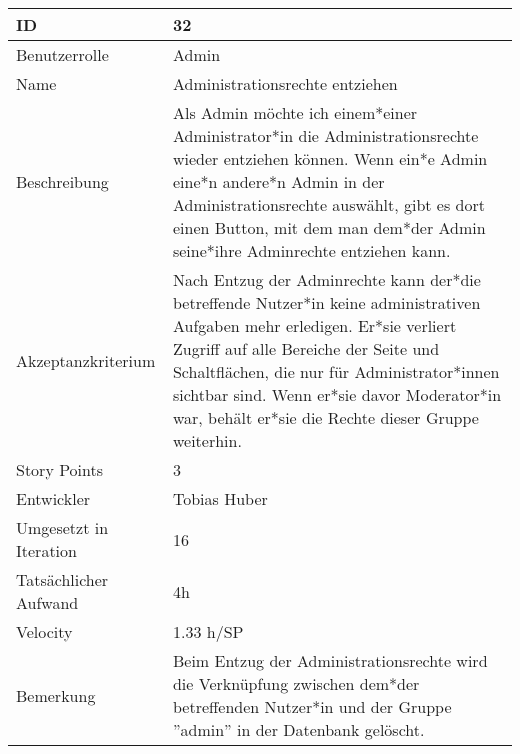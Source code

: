 \begin{tabularx}{\textwidth}{|p{}|X|}
	\hline
	ID & 32 \\
	\hline
	Benutzerrolle & Admin \\
	\hline
	Name & Administrationsrechte entziehen\\
	\hline
	Beschreibung & Als Admin möchte ich einem*einer Administrator*in die Administrationsrechte wieder entziehen können. Wenn ein*e Admin eine*n andere*n Admin in der Administrationsrechte auswählt, gibt es dort einen Button, mit dem man dem*der Admin seine*ihre Adminrechte entziehen kann.  \\
	\hline
	Akzeptanzkriterium & Nach Entzug der Adminrechte kann der*die betreffende Nutzer*in keine administrativen Aufgaben mehr erledigen. Er*sie verliert Zugriff auf alle Bereiche der Seite und Schaltflächen, die nur für Administrator*innen sichtbar sind. Wenn er*sie davor Moderator*in war, behält er*sie die Rechte dieser Gruppe weiterhin. \\
	\hline
	Story Points & 3 \\
	\hline
	Entwickler & Tobias Huber \\
	\hline
	Umgesetzt in Iteration & 16\\
	\hline
	Tatsächlicher Aufwand & 4h\\
	\hline
	Velocity & 1.33 h/SP\\
	\hline
	Bemerkung & Beim Entzug der Administrationsrechte wird die Verknüpfung zwischen dem*der betreffenden Nutzer*in und der Gruppe ''admin'' in der Datenbank gelöscht.\\
	\hline
\end{tabularx}
\vspace{20pt}
